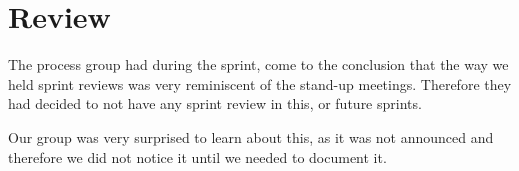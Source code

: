 \section{Review} \label{SEC:sprint3review}
The process group had during the sprint, come to the conclusion that the way we held sprint reviews was very reminiscent of the stand-up meetings.
Therefore they had decided to not have any sprint review in this, or future sprints. 

Our group was very surprised to learn about this, as it was not announced and therefore we did not notice it until we needed to document it.
